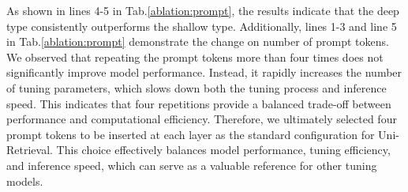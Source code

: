 As shown in lines 4-5 in Tab.\ref{ablation:prompt}, the results indicate that the deep type consistently outperforms the shallow type. Additionally, lines 1-3 and line 5 in Tab.\ref{ablation:prompt} demonstrate the change on number of prompt tokens. We observed that repeating the prompt tokens more than four times does not significantly improve model performance. Instead, it rapidly increases the number of tuning parameters, which slows down both the tuning process and inference speed. This indicates that four repetitions provide a balanced trade-off between performance and computational efficiency. Therefore, we ultimately selected four prompt tokens to be inserted at each layer as the standard configuration for Uni-Retrieval. This choice effectively balances model performance, tuning efficiency, and inference speed, which can serve as a valuable reference for other tuning models.


